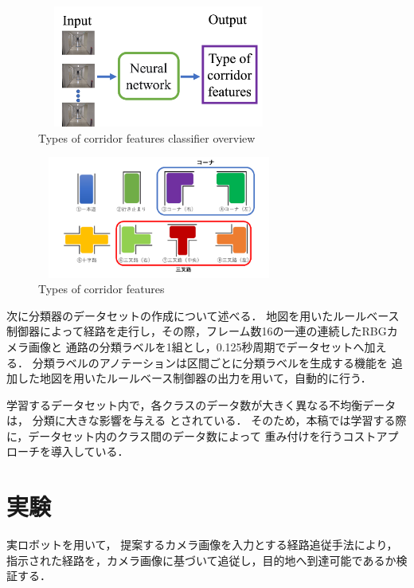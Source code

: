 \documentclass{sice-si}
\begin{document}
\begin{figure}[h!]
    \centering
     \includegraphics[height=40mm,width=80mm]{./figs/LRCN_gai.png}
     \caption{Types of corridor features classifier overview}\label{fig:lrcn}
\end{figure}
\begin{figure}[h!]
    \centering
     \includegraphics[height=40mm,width=80mm]{./figs/type.png}
     \caption{Types of corridor features}\label{fig:intersection}
\end{figure}
\par
次に分類器のデータセットの作成について述べる．
地図を用いたルールベース制御器によって経路を走行し，その際，フレーム数16の一連の連続したRBGカメラ画像と
通路の分類ラベルを1組とし，0.125秒周期でデータセットへ加える．
分類ラベルのアノテーションは区間ごとに分類ラベルを生成する機能を
追加した地図を用いたルールベース制御器の出力を用いて，自動的に行う．
\par
学習するデータセット内で，各クラスのデータ数が大きく異なる不均衡データは，
分類に大きな影響を与える
\cite{hukin}
とされている．
そのため，本稿では学習する際に，データセット内のクラス間のデータ数によって
重み付けを行うコストアプローチ\cite{cost}を導入している．

\section{実験}
実ロボットを用いて，
提案するカメラ画像を入力とする経路追従手法により，
指示された経路を，カメラ画像に基づいて追従し，目的地へ到達可能であるか検証する．
\end{document}
